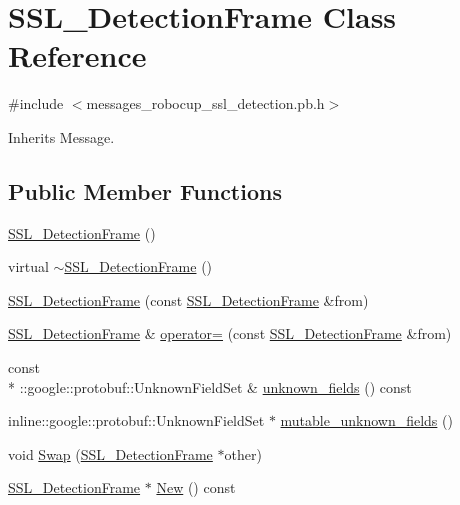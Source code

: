 \hypertarget{class_s_s_l___detection_frame}{\section{S\-S\-L\-\_\-\-Detection\-Frame Class Reference}
\label{class_s_s_l___detection_frame}
}


{\ttfamily \#include $<$messages\-\_\-robocup\-\_\-ssl\-\_\-detection.\-pb.\-h$>$}



Inherits Message.

\subsection*{Public Member Functions}
\begin{DoxyCompactItemize}
\item 
\hyperlink{class_s_s_l___detection_frame_a89ec0a2a1926140bf45b81969f65aa88}{S\-S\-L\-\_\-\-Detection\-Frame} ()
\item 
virtual \hyperlink{class_s_s_l___detection_frame_abd8451ccda7a45112c8ed4992849dd54}{$\sim$\-S\-S\-L\-\_\-\-Detection\-Frame} ()
\item 
\hyperlink{class_s_s_l___detection_frame_a59f6abbfbd4f8fb30e2513d0495f6e28}{S\-S\-L\-\_\-\-Detection\-Frame} (const \hyperlink{class_s_s_l___detection_frame}{S\-S\-L\-\_\-\-Detection\-Frame} \&from)
\item 
\hyperlink{class_s_s_l___detection_frame}{S\-S\-L\-\_\-\-Detection\-Frame} \& \hyperlink{class_s_s_l___detection_frame_a5bd6b57345ca2f107575de56b1db79ce}{operator=} (const \hyperlink{class_s_s_l___detection_frame}{S\-S\-L\-\_\-\-Detection\-Frame} \&from)
\item 
const \\*
\-::google\-::protobuf\-::\-Unknown\-Field\-Set \& \hyperlink{class_s_s_l___detection_frame_af4e23f54ff749e88020b1a1457cffda5}{unknown\-\_\-fields} () const 
\item 
inline\-::google\-::protobuf\-::\-Unknown\-Field\-Set $\ast$ \hyperlink{class_s_s_l___detection_frame_a97facfcd709da363b840803eae9aef27}{mutable\-\_\-unknown\-\_\-fields} ()
\item 
void \hyperlink{class_s_s_l___detection_frame_a77704a10d1392e29ab9494b81987b92a}{Swap} (\hyperlink{class_s_s_l___detection_frame}{S\-S\-L\-\_\-\-Detection\-Frame} $\ast$other)
\item 
\hyperlink{class_s_s_l___detection_frame}{S\-S\-L\-\_\-\-Detection\-Frame} $\ast$ \hyperlink{class_s_s_l___detection_frame_a75efe799090d9190260ad6552011ef01}{New} () const 

\end{DoxyCompactItemize}
